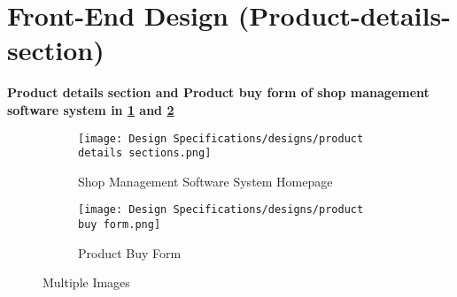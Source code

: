 \section{Front-End Design (Product-details-section)}
\vspace{0.2cm}
\textbf{Product details section and Product buy form of shop management software system in \ref{fig:fig 5.3} and \ref{fig:fig 5.4}}\\
\begin{figure}[ht]
    \centering
    \begin{subfigure}{\textwidth}
        \centering  
        \texttt{[image: Design Specifications/designs/product details sections.png]}    
        \caption{Shop Management Software System Homepage}
        \label{fig:fig 5.3}
    \end{subfigure}
    
    \begin{subfigure}{\textwidth}
        \centering  
        \texttt{[image: Design Specifications/designs/product buy form.png]}    
        \caption{Product Buy Form}
        \label{fig:fig 5.4}
    \end{subfigure}
    
    \caption{Multiple Images}
    \label{fig:multiple_images}
\end{figure}


   
